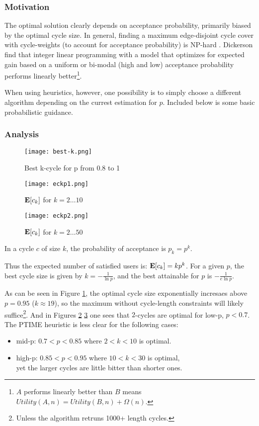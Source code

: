 \documentclass[main.tex]{subfiles}
\begin{document}
\subsubsection{Motivation}
The optimal solution clearly depends on acceptance probability, primarily biased by the optimal cycle size. In general, finding a maximum edge-disjoint cycle cover with cycle-weights (to account for acceptance probability) is NP-hard \cite{Bir}. Dickerson \cite{Dick} \cite{Dick3} find that integer linear programming with a model that optimizes for expected gain based on a uniform or bi-modal (high and low) acceptance probability performs linearly better\footnote{$A$ performs linearly better than $B$ means $Utility(A,n) = Utility(B,n) + \Omega(n)$.}.

When using heuristics, however, one possibility is to simply choose a different algorithm depending on the currest estimation for $p$. Included below is some basic probabilistic guidance.

\subsubsection{Analysis}

\begin{figure}
  \texttt{[image: best-k.png]}
  \caption{Best k-cycle for p from 0.8 to 1}
  \label{best-k}
\end{figure}

\begin{figure}
  \texttt{[image: eckp1.png]}
  \caption{$\mathbf{E}[c_k]$ for $k = 2 \dots 10$}
  \label{eckp1}
\end{figure}

\begin{figure}
  \texttt{[image: eckp2.png]}
  \caption{$\mathbf{E}[c_k]$ for $k = 2 \dots 50$}
  \label{eckp2}
\end{figure}

In a cycle $c$ of size $k$, the probability of acceptance is $p_k = p^k$.

Thus the expected number of satisfied users is: $\mathbf{E}[c_k] = k p^k$. For a given $p$, the best cycle size is given by $k = -\frac{1}{\ln p}$, and the best attainable for $p$ is $-\frac{1}{e \ln p}$.

As can be seen in Figure \ref{best-k}, the optimal cycle size exponentially incresaes above $p = 0.95$ ($k \approx 19$), so the maximum without cycle-length constraints will likely suffice\footnote{Unless the algorithm retruns 1000+ length cycles.}. And in Figures \ref{eckp1} \ref{eckp2} one sees that $2$-cycles are optimal for low-p, $p < 0.7$. The PTIME heuristic is less clear for the following cases:
\begin{itemize}
  \item mid-p: $0.7 < p < 0.85$ where $ 2 < k < 10$ is optimal.
  \item high-p: $0.85 < p < 0.95$ where $ 10 < k < 30$ is optimal,
      \\yet the larger cycles are little bitter than shorter ones.
\end{itemize}
\end{document}
